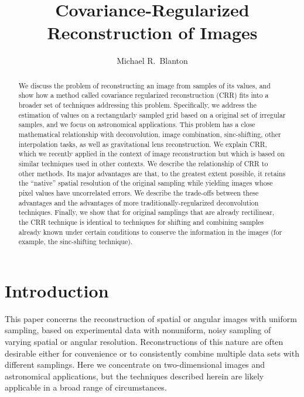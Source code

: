 \documentclass[twocolumn,tighten]{aastex61}
\newcounter{address}
\begin{document}
\renewcommand{\arraystretch}{0.8}

\title{Covariance-Regularized Reconstruction of Images}

\author[0000-0003-1641-6222]{Michael R.~Blanton}

\setcounter{address}{1}

\begin{abstract}
We discuss the problem of reconstructing an image from samples of its
values, and show how a method called covariance regularized
reconstruction (CRR) fits into a broader set of techniques addressing
this problem. Specifically, we address the estimation of values on a
rectangularly sampled grid based on a original set of irregular
samples, and we focus on astronomical applications. This problem has a
close mathematical relationship with deconvolution, image combination,
sinc-shifting, other interpolation tasks, as well as gravitational
lens reconstruction. We explain CRR, which we recently applied in the
context of image reconstruction but which is based on similar
techniques used in other contexts. We describe the relationship of CRR
to other methods. Its major advantages are that, to the greatest
extent possible, it retains the ``native'' spatial resolution of the
original sampling while yielding images whose pixel values have
uncorrelated errors. We describe the trade-offs between these
advantages and the advantages of more traditionally-regularized
deconvolution techniques. Finally, we show that for original samplings
that are already rectilinear, the CRR technique is identical to
techniques for shifting and combining samples already known under
certain conditions to conserve the information in the images (for
example, the sinc-shifting technique).
\end{abstract}

\section{Introduction}
\label{sec:intro}

This paper concerns the reconstruction of spatial or angular images
with uniform sampling, based on experimental data with nonuniform,
noisy sampling of varying spatial or angular
resolution. Reconstructions of this nature are often desirable either
for convenience or to consistently combine multiple data sets with
different samplings.  Here we concentrate on two-dimensional images
and astronomical applications, but the techniques described herein are
likely applicable in a broad range of circumstances.
\end{document}
